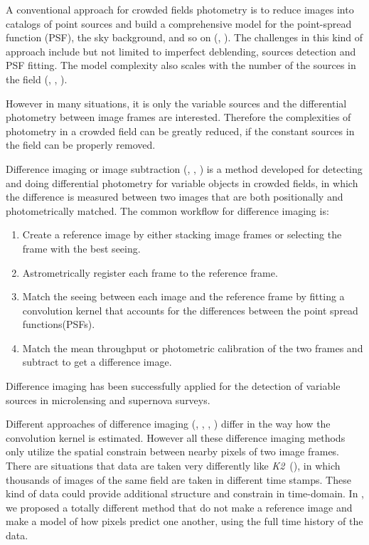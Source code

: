 \documentclass[12pt, preprint]{aastex}
\newcommand{\project}[1]{\textsl{#1}}
\newcommand{\ktwo}{\project{K2}}
\begin{document}
A conventional approach for crowded fields photometry is to reduce images into catalogs of point sources and build a comprehensive model for the point-spread function (PSF),  the sky background, and so on (\citealt{psf1}, \citealt{psf2}).
The challenges in this kind of approach include but not limited to imperfect deblending, sources detection and PSF fitting.
The model complexity also scales with the number of the sources in the field (\citealt{crowd1}, \citealt{crowd2}, \citealt{crowd3}).

However in many situations, it is only the variable sources and the differential photometry between image frames are interested.
Therefore the complexities of photometry in a crowded field can be greatly reduced, if the constant sources in the field can be properly removed.

Difference imaging or image subtraction (\citealt{imagesub1}, \citealt{alard}, \citealt{varyingkernel}) is a method developed for detecting and doing differential photometry for variable objects in crowded fields, in which the difference is measured between two images that are both positionally and photometrically matched.
The common workflow for difference imaging is:
\begin{enumerate}
\item
Create a reference image by either stacking image frames or selecting the frame with the best seeing.
\item
Astrometrically register each frame to the reference frame.
\item
Match the seeing between each image and the reference frame by fitting a convolution kernel that accounts for the differences between the point spread functions(PSFs).
\item
Match the mean throughput or photometric calibration of the two frames and subtract to get a difference image.
\end{enumerate}
Difference imaging has been successfully applied for the detection of variable sources in microlensing \citep{macho, ogle} and supernova \citep{sdss} surveys.

Different approaches of difference imaging (\citealt{imagesub1}, \citealt{alard}, \citealt{varyingkernel}, \citealt{bramich}) differ in the way how the convolution kernel is estimated.
However all these difference imaging methods only utilize the spatial constrain between nearby pixels of two image frames.
There are situations that data are taken very differently like \ktwo\ (\citealt{k2}), in which thousands of images of the same field are taken in different time stamps.
These kind of data could provide additional structure and constrain in time-domain.
In , we proposed a totally different method that do not make a reference image and make a model of how pixels predict one another, using the full time history of the data.
\end{document}
